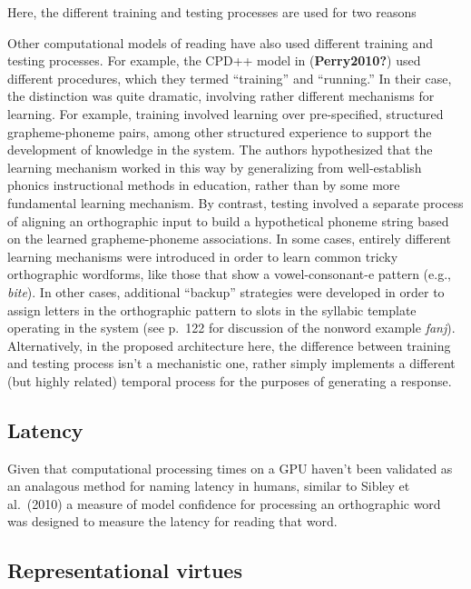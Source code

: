\documentclass[
  american,
  ,man,floatsintext]{apa6}
\begin{document}
Here, the different training and testing processes are used for two reasons

Other computational models of reading have also used different training and testing processes. For example, the CPD++ model in (\textbf{Perry2010?}) used different procedures, which they termed ``training'' and ``running.'' In their case, the distinction was quite dramatic, involving rather different mechanisms for learning. For example, training involved learning over pre-specified, structured grapheme-phoneme pairs, among other structured experience to support the development of knowledge in the system. The authors hypothesized that the learning mechanism worked in this way by generalizing from well-establish phonics instructional methods in education, rather than by some more fundamental learning mechanism. By contrast, testing involved a separate process of aligning an orthographic input to build a hypothetical phoneme string based on the learned grapheme-phoneme associations. In some cases, entirely different learning mechanisms were introduced in order to learn common tricky orthographic wordforms, like those that show a vowel-consonant-e pattern (e.g., \emph{bite}). In other cases, additional ``backup'' strategies were developed in order to assign letters in the orthographic pattern to slots in the syllabic template operating in the system (see p.~122 for discussion of the nonword example \emph{fanj}). Alternatively, in the proposed architecture here, the difference between training and testing process isn't a mechanistic one, rather simply implements a different (but highly related) temporal process for the purposes of generating a response.

\hypertarget{latency}{%
\subsection{Latency}\label{latency}}

Given that computational processing times on a GPU haven't been validated as an analagous method for naming latency in humans, similar to Sibley et al.~(2010) a measure of model confidence for processing an orthographic word was designed to measure the latency for reading that word.

\hypertarget{representational-virtues}{%
\subsection{Representational virtues}\label{representational-virtues}}
\end{document}

